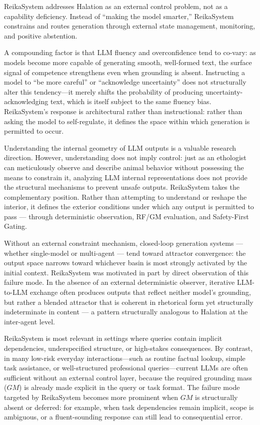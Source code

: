 \documentclass[11pt,a4paper]{article}
\begin{document}
ReikaSystem addresses Halation as an external control problem, not as a capability deficiency.
Instead of ``making the model smarter,'' ReikaSystem constrains and routes generation through
external state management, monitoring, and positive abstention.

A compounding factor is that LLM fluency and overconfidence tend to co-vary: as models become
more capable of generating smooth, well-formed text, the surface signal of competence strengthens
even when grounding is absent. Instructing a model to ``be more careful'' or ``acknowledge
uncertainty'' does not structurally alter this tendency---it merely shifts the probability of
producing uncertainty-acknowledging text, which is itself subject to the same fluency bias.
ReikaSystem's response is architectural rather than instructional: rather than asking the model
to self-regulate, it defines the space within which generation is permitted to occur.

Understanding the internal geometry of LLM outputs is a valuable research direction.
However, understanding does not imply control: just as an ethologist can meticulously
observe and describe animal behavior without possessing the means to constrain it,
analyzing LLM internal representations does not provide the structural mechanisms
to prevent unsafe outputs.
ReikaSystem takes the complementary position. Rather than attempting to understand
or reshape the interior, it defines the exterior conditions under which any output
is permitted to pass --- through deterministic observation, RF/GM evaluation,
and Safety-First Gating.

Without an external constraint mechanism, closed-loop generation systems ---
whether single-model or multi-agent --- tend toward attractor convergence:
the output space narrows toward whichever basin is most strongly activated by
the initial context.
ReikaSystem was motivated in part by direct observation of this failure mode.
In the absence of an external deterministic observer, iterative LLM-to-LLM
exchange often produces outputs that reflect neither model's grounding,
but rather a blended attractor that is coherent in rhetorical form yet
structurally indeterminate in content --- a pattern structurally analogous
to Halation at the inter-agent level.

ReikaSystem is most relevant in settings where queries contain implicit dependencies,
underspecified structure, or high-stakes consequences.
By contrast, in many low-risk everyday interactions---such as routine factual lookup,
simple task assistance, or well-structured professional queries---current LLMs are often
sufficient without an external control layer, because the required grounding mass ($GM$)
is already made explicit in the query or task format.
The failure mode targeted by ReikaSystem becomes more prominent when $GM$ is structurally
absent or deferred: for example, when task dependencies remain implicit, scope is ambiguous,
or a fluent-sounding response can still lead to consequential error.
\end{document}
